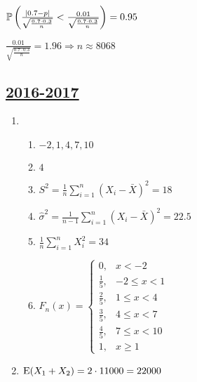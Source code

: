 \begin{enumerate}
\begin{enumerate}
$\P\left(\frac{|0.7 - p|}{\sqrt{\frac{0.7 \cdot 0.3}{n}}} < \frac{0.01}{\sqrt{\frac{0.7 \cdot 0.3}{n}}} \right) = 0.95$

$\frac{0.01}{\sqrt{\frac{0.7 \cdot 0.3}{n}}} = 1.96 \Rightarrow n \approx 8068$
\end{enumerate}
\end{enumerate}


\subsection[2016-2017]{\hyperref[sec:kr_03_2016_2017]{2016-2017}}
\label{sec:sol_kr_03_2016_2017}


\begin{enumerate}
\item
\begin{enumerate}
\item $-2, 1, 4, 7, 10$
\item $4$
\item $S^2 = \frac{1}{n} \sum_{i=1}^n (X_i - \bar{X})^2 = 18$
\item $\hat\sigma^2 = \frac{1}{n-1} \sum_{i=1}^n (X_i - \bar{X})^2 = 22.5$
\item $\frac{1}{n} \sum_{i=1}^n X_i^2 = 34$
\item $F_n(x) = \begin{cases}
0, & x < -2 \\
\frac{1}{5}, & -2 \leq x < 1 \\
\frac{2}{5}, & 1 \leq x < 4 \\
\frac{3}{5}, & 4 \leq x < 7 \\
\frac{4}{5}, & 7 \leq x < 10 \\
1, & x \geq 1
\end{cases}$
\end{enumerate}
\item $\E(X_1 + X_2) = 2 \cdot 11000 = 22000$


\end{enumerate}
